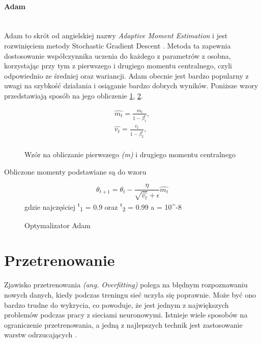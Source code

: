 \paragraph{Adam} \mbox{}\\
Adam to skrót od angielskiej nazwy \textit{Adaptive Moment Estimation} i jest rozwinięciem
metody Stochastic Gradient Descent \cite{OptimizersOverview,AdamOptimizer}.
Metoda ta zapewnia dostosowanie współczynnika uczenia do każdego z parametrów z osobna,
korzystając przy tym z pierwszego i drugiego momentu centralnego, czyli odpowiednio ze
średniej oraz wariancji. Adam obecnie jest bardzo popularny z uwagi na szybkość działania
i osiąganie bardzo dobrych wyników. Poniższe wzory przedstawiają sposób na jego obliczenie \ref{eq:moments_adam}, \ref{eq:adam}.
\begin{figure}[h!]
\renewcommand{\figurename}{Wzór}%
\begin{equation*}
\begin{align*}
\hat{m_t} = \frac{m_t} {1 - \beta^t_1}, \\
\hat{v_t} = \frac{v_t} {1 - \beta^t_2}, \\
\end{align*}
\end{equation*}
\caption{Wzór na obliczanie pierwszego \textit{(m)} i drugiego  momentu centralnego}
\label{eq:moments_adam}
\end{figure}
Obliczone momenty podstawiane są do wzoru
\begin{figure}[h!]
\renewcommand{\figurename}{Wzór}%
\begin{equation*}
\theta_{t+1} = \theta_t - \frac {\eta} {\sqrt{\hat{v_t}} + \epsilon} \hat{m_t}
\end{equation*}
\centering
gdzie najczęściej \textbeta \textsuperscript{t}\textsubscript{1} = 0.9 oraz
\textbeta \textsuperscript{t}\textsubscript{2} = 0.99 a \straightepsilon = 10^{-8}\\
\caption{Optymalizator Adam}
\label{eq:adam}
\end{figure}

\section{Przetrenowanie}
Zjawisko przetrenowania \textit{(ang. Overfitting)} polega na błędnym rozpoznawaniu nowych danych,
kiedy podczas treningu sieć uczyła się poprawnie. Może być ono bardzo trudne do wykrycia,
co powoduje, że jest jednym z największych problemów podczas pracy z sieciami neuronowymi.
Istnieje wiele sposobów na ograniczenie przetrenowania, a jedną z najlepszych technik
jest zastosowanie warstw odrzucających \cite{DropoutPreventOverfit}.

